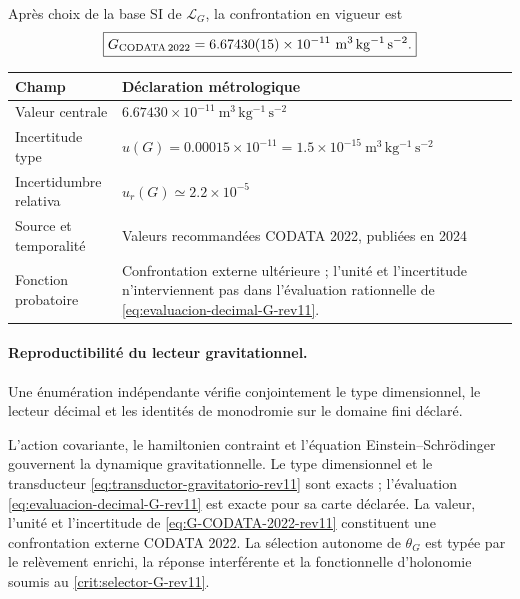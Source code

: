 Après choix de la base SI de \(\mathcal L_G\), la confrontation en vigueur est
\begin{equation}
 \boxed{
 G_{\rm CODATA\,2022}=6.67430(15)\times10^{-11}
 \ \mathrm{m^3\,kg^{-1}\,s^{-2}}.}
 \label{eq:G-CODATA-2022-rev11}
\end{equation}

\begin{center}
\begin{tabularx}{0.94\textwidth}{@{}L{0.27\textwidth}Y@{}}
\toprule
Champ & Déclaration métrologique\\
\midrule
Valeur centrale &
\(6.67430\times10^{-11}\ \mathrm{m^3\,kg^{-1}\,s^{-2}}\)\\
Incertitude type &
\(u(G)=0.00015\times10^{-11}
=1.5\times10^{-15}\ \mathrm{m^3\,kg^{-1}\,s^{-2}}\)\\
Incertidumbre relativa & \(u_r(G)\simeq2.2\times10^{-5}\)\\
Source et temporalité &
Valeurs recommandées CODATA 2022, publiées en 2024
\cite{CODATA2022}\\
Fonction probatoire &
Confrontation externe ultérieure ; l'unité et l'incertitude n'interviennent pas dans
l'évaluation rationnelle de \eqref{eq:evaluacion-decimal-G-rev11}.\\
\bottomrule
\end{tabularx}
\end{center}

\paragraph{Reproductibilité du lecteur gravitationnel.}
Une énumération indépendante vérifie conjointement le type dimensionnel, le
lecteur décimal et les identités de monodromie sur le domaine fini
déclaré.

\begin{proposition}
L'action covariante, le hamiltonien contraint et l'équation
Einstein--Schrödinger gouvernent la dynamique gravitationnelle. Le type dimensionnel
et le transducteur \eqref{eq:transductor-gravitatorio-rev11} sont exacts ;
l'évaluation \eqref{eq:evaluacion-decimal-G-rev11} est exacte pour sa carte
déclarée. La valeur, l'unité et l'incertitude de
\eqref{eq:G-CODATA-2022-rev11} constituent une confrontation externe CODATA 2022. La
sélection autonome de \(\theta_G\) est typée par le relèvement
enrichi, la réponse interférente et la fonctionnelle d'holonomie soumis
au \cref{crit:selector-G-rev11}.
\end{proposition}
